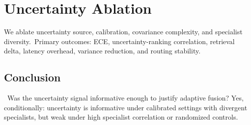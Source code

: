 \section{Uncertainty Ablation}
We ablate uncertainty source, calibration, covariance complexity, and specialist diversity.\
Primary outcomes: ECE, uncertainty-ranking correlation, retrieval delta, latency overhead, variance reduction, and routing stability.\
\subsection{Conclusion}\
Was the uncertainty signal informative enough to justify adaptive fusion? Yes, conditionally: uncertainty is informative under calibrated settings with divergent specialists, but weak under high specialist correlation or randomized controls.
